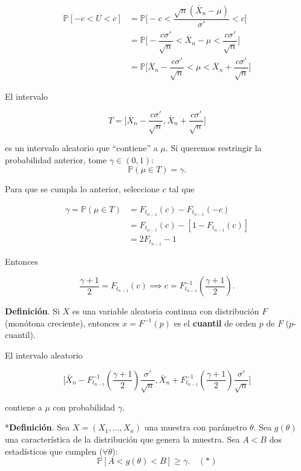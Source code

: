 \documentclass[
  12pt,
]{book}
\begin{document}
\begin{align*} 
\mathbb P[-c<U<c] & = \mathbb P \bigg[ -c<\dfrac{\sqrt{n}(\bar
X_n-\mu)}{\sigma'} <c\bigg]\\ & = \mathbb P \bigg[-\dfrac{c\sigma'}{\sqrt n} <
\bar X_n - \mu <\dfrac{c\sigma'}{\sqrt n}\bigg] \\ & = \mathbb P \bigg[ \bar X_n
-\dfrac{c\sigma'}{\sqrt n} < \mu < \bar X_n + \dfrac{c\sigma'}{\sqrt n}\bigg]
\end{align*}

El intervalo

\begin{equation*}
T = \bigg[\bar X_n - \dfrac{c\sigma'}{\sqrt n},\bar X_n + \dfrac{c\sigma'}{\sqrt
n}\bigg]
\end{equation*}

es un intervalo aleatorio que ``contiene'' a \(\mu\). Si queremos restringir la
probabilidad anterior, tome \(\gamma \in (0,1)\): \[ \mathbb P(\mu\in T) = \gamma. \]

Para que se cumpla lo anterior, seleccione \(c\) tal que

\begin{align*} \gamma = \mathbb P( \mu \in T) & = F_{t_{n-1}}(c)-F_{t_{n-1}}(-c)
\\ & = F_{t_{n-1}}(c) - [1-F_{t_{n-1}}(c)]\\ & = 2F_{t_{n-1}} - 1 \end{align*}

Entonces

\[ \dfrac{\gamma+1}2 = F_{t_{n-1}}(c) \implies c = F_{t_{n-1}}^{-1}\left(\dfrac{\gamma+1}2
\right). \]

\textbf{Definición}. Si \(X\) es una variable aleatoria continua con distribución \(F\)
(monótona creciente), entonces \(x=F^{-1}(p)\) es el \textbf{cuantil} de orden \(p\) de
\(F\) (\(p\)-cuantil).

El intervalo aleatorio

\begin{equation*}
\bigg[\bar X_n -
F_{t_{n-1}}^{-1}\left(\dfrac{\gamma+1}2 \right)\dfrac{\sigma'}{\sqrt n},\bar X_n
+ F_{t_{n-1}}^{-1}\left(\dfrac{\gamma+1}2 \right)\dfrac{\sigma'}{\sqrt
  n}\bigg]
\end{equation*}

contiene a \(\mu\) con probabilidad \(\gamma\).

*\textbf{Definición}. Sea \(X = (X_1,\dots,X_n)\) una muestra con parámetro \(\theta\).
Sea \(g(\theta)\) una característica de la distribución que genera la muestra. Sea \(A < B\) dos estadísticos que cumplen (\(\forall \theta\)):
\[
\mathbb P [A<g(\theta)<B]\geq \gamma.\quad
(*)
\]
\end{document}
